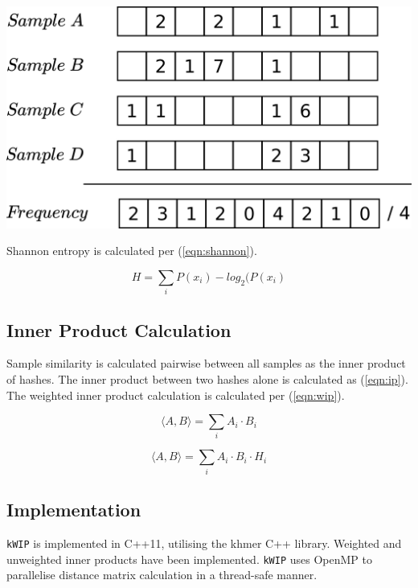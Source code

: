 \documentclass[a0,portrait]{a0poster}
\begin{document}
\begin{multicols}{2}
\begin{center}
  \vspace{1cm}
  \includegraphics[width=25cm]{freq_vector.png}
  \vspace{1cm}
\end{center}

Shannon entropy is calculated per (\ref{eqn:shannon}).

\begin{equation}
  H = \sum_{i} P(x_i) -log_2(P(x_i)
\label{eqn:shannon}
\end{equation}

\subsection*{Inner Product Calculation}

Sample similarity is calculated pairwise between all samples as the inner
product of hashes. The inner product between two hashes alone is calculated as
(\ref{eqn:ip}). The weighted inner product calculation is calculated per
(\ref{eqn:wip}).

\begin{equation}
  \langle A, B \rangle = \sum_{i} A_i \cdot B_i
\label{eqn:ip}
\end{equation}

\begin{equation}
  \langle A, B \rangle = \sum_{i} A_i \cdot B_i \cdot H_i
\label{eqn:wip}
\end{equation}

\subsection*{Implementation}

\texttt{kWIP} is implemented in C++11, utilising the khmer C++ library. Weighted
and unweighted inner products have been implemented. \texttt{kWIP} uses OpenMP
to parallelise distance matrix calculation in a thread-safe manner.



\end{multicols}
\end{document}
